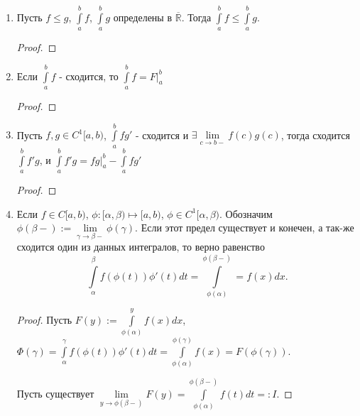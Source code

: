 \begin{properties}
\begin{enumerate}
\begin{proof}
                Тогда 
                \[ \int\limits_{a}^{b} f = \lim\limits_{c \to b-} F(c) - F(a)  .\]
                \[ \int\limits_{a}^{b} g = \lim\limits_{c \to b-} G(c) - G(a)  .\]
                \[ \int\limits_{a}^{b} \left( \alpha f + \beta g \right) = \lim\limits_{c \to b-} \int\limits_{a}^{c} \left( \alpha f + \beta g \right) = \alpha \lim\limits_{c \to b-} F(c) + \beta \lim\limits_{c \to b-} G(c) = \alpha \int\limits_{a}^{b} f + \beta \int\limits_{a}^{b} g      \qedhere.\] 
            \end{proof}
        \item Пусть $f \le g$, $\int\limits_{a}^{b} f $, $\int\limits_{a}^{b} g $ определены в $\overline{\mathbb{R}}$. Тогда $\int\limits_{a}^{b} f \le \int\limits_{a}^{b} g  $.
            \begin{proof}
                \TODO
            \end{proof}
            \item Если $\int\limits_{a}^{b} f $ - сходится, то $\int\limits_{a}^{b} f = \left. F\right|_{a}^{b} $
                    \begin{proof}
                        \TODO
                    \end{proof}
                \item Пусть $f,g\in C^{1}[a, b)$, $\int\limits_{a}^{b} fg'$ - сходится и $\exists{} \lim\limits_{c \to b-} f(c)g(c)$, тогда сходится $\int\limits_{a}^{b} f'g $, и $\int\limits_{a}^{b} f'g = \left. fg\right|_{a}^{b} - \int\limits_{a}^{b} fg'   $
                        \begin{proof}
                            \TODO
                        \end{proof}
                    \item Если $f\in C[a, b)$, $\phi : [\alpha, \beta) \mapsto [a, b)$, $\phi\in C^{1}[\alpha, \beta)$. Обозначим $\phi(\beta-) := \lim\limits_{\gamma \to \beta-} \phi(\gamma)$. Если этот предел существует и конечен, а так-же сходится один из данных интегралов, то верно равенство
                        \[ \int\limits_{\alpha}^{\beta} f(\phi(t))\phi'(t)dt = \int\limits_{\phi(\alpha)}^{\phi(\beta-)} = f(x)dx    .\]
                        \begin{proof}
                            Пусть $F(y) := \int\limits_{\phi(\alpha)}^{y} f(x)dx  $, $\Phi(\gamma) = \int\limits_{\alpha}^{\gamma} f(\phi(t))\phi'(t)dt = \int\limits_{\phi(\alpha)}^{\phi(\gamma)} f(x) = F(\phi(\gamma))$.

                            Пусть существует $\lim\limits_{y \to \phi(\beta-)} F(y) = \int\limits_{\phi(\alpha)}^{\phi(\beta-)} f(t)dt  =: I $.


\end{proof}
\end{enumerate}
\end{properties}
